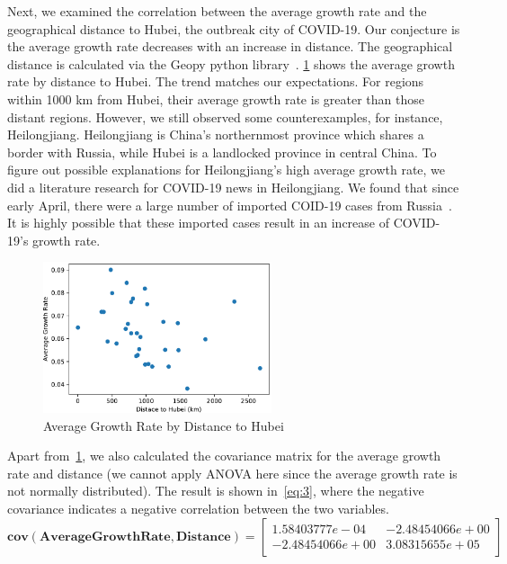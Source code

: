 Next, we examined the correlation between the average growth rate and the geographical distance to Hubei, the outbreak city of COVID-19. Our conjecture is the average growth rate decreases with an increase in distance. The geographical distance is calculated via the Geopy python library~\cite{geopy}. \cref{fig:ly2} shows the average growth rate by distance to Hubei. The trend matches our expectations. For regions within 1000 km from Hubei, their average growth rate is greater than those distant regions. However, we still observed some counterexamples, for instance, Heilongjiang. Heilongjiang is China's northernmost province which shares a border with Russia, while Hubei is a landlocked province in central China. To figure out possible explanations for Heilongjiang's high average growth rate, we did a literature research for COVID-19 news in Heilongjiang. We found that since early April, there were a large number of imported COID-19 cases from Russia~\cite{heilongjiang}. It is highly possible that these imported cases result in an increase of COVID-19's growth rate.
\begin{figure}[htp]
  \centering
  \includegraphics[width=0.6\textwidth]{ly2.pdf}
  \caption{Average Growth Rate by Distance to Hubei}
  \label{fig:ly2}
\end{figure}

Apart from~\cref{fig:ly2}, we also calculated the covariance matrix for the average growth rate and distance (we cannot apply ANOVA here since the average growth rate is not normally distributed). The result is shown in~\cref{eq:3}, where the negative covariance indicates a negative correlation between the two variables.
\begin{equation}
    \bm{cov}(\bm{AverageGrowthRate}, \bm{Distance}) = 
    \begin{bmatrix}
        1.58403777e-04 & -2.48454066e+00 \\
        -2.48454066e+00 & 3.08315655e+05
    \end{bmatrix}\label{eq:3}
\end{equation}

